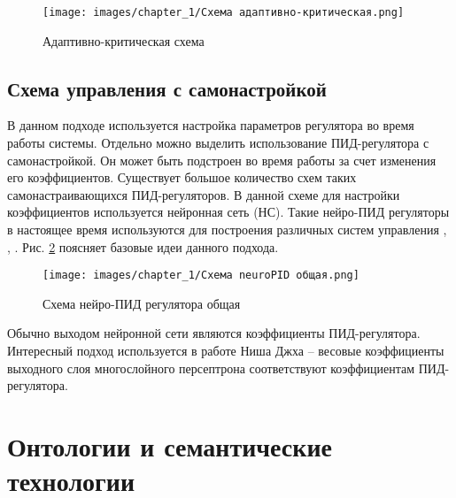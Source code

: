 \begin{figure}[H]
    \centering
    \texttt{[image: images/chapter\_1/Схема адаптивно-критическая.png]}
    \caption{Адаптивно-критическая схема}
    \label{fig:adaptive_critic_control}
\end{figure}

\subsection{Схема управления с самонастройкой}

В данном подходе используется настройка параметров регулятора во время работы системы. Отдельно можно выделить использование ПИД-регулятора с самонастройкой. Он может быть подстроен во время работы за счет изменения его коэффициентов. Существует большое количество схем таких самонастраивающихся ПИД-регуляторов. В данной схеме для настройки коэффициентов  используется нейронная сеть (НС).
Такие нейро-ПИД регуляторы в настоящее время используются для построения различных систем управления \cite{Omatu_Khalid_Yusof}, \cite{Omatu1997}, \cite{Omatu2010}. Рис. \ref{fig:neuro_PID_control} поясняет базовые идеи данного подхода.

\begin{figure}[H]
    \centering
    \texttt{[image: images/chapter\_1/Схема neuroPID общая.png]}
    \caption{Схема нейро-ПИД регулятора общая}
    \label{fig:neuro_PID_control}
\end{figure}

Обычно выходом нейронной сети являются коэффициенты ПИД-регулятора. Интересный подход используется в работе Ниша Джха \cite{Nisha2011} – весовые коэффициенты выходного слоя многослойного персептрона соответствуют коэффициентам ПИД-регулятора.

\section{Онтологии и семантические технологии}

